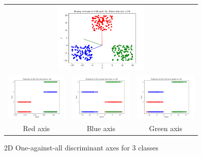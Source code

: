 \documentclass{bmvc2k}
\begin{document}
\begin{figure}[H]
   \begin{center}
      \begin{tabular}{c c c}
         \multicolumn{3}{c}{\includegraphics[width=4.5cm]{figures/binaryRelevance3classes.png}
         }\\
         \includegraphics[width=3cm]{figures/projectionRedAll.png}&\includegraphics[width=3cm]{figures/projectionBlueAll.png}&
         \includegraphics[width=3cm]{figures/projectionGreenAll.png}\\
         Red axis&Blue axis&Green axis
      \end{tabular}
   \end{center}
   \caption{2D One-against-all discriminant axes for 3 classes}
\end{figure}
\end{document}
